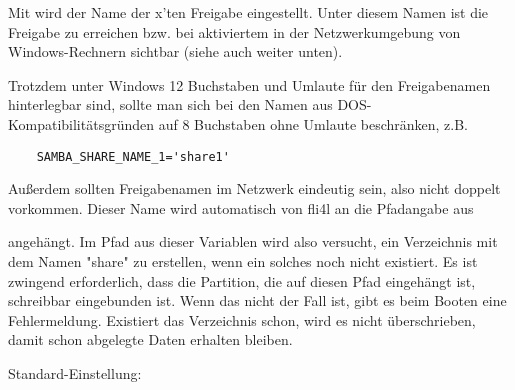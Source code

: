 \begin{description}

        Mit  wird der Name der x'ten Freigabe eingestellt.
        Unter diesem Namen ist die Freigabe zu erreichen bzw. bei aktiviertem
         in der Netzwerkumgebung von Windows-Rechnern sichtbar
        (siehe auch  weiter unten).

        Trotzdem unter Windows 12 Buchstaben und Umlaute für den Freigabenamen
        hinterlegbar sind, sollte man sich bei den Namen aus
        DOS-Kompatibilitätsgründen auf 8 Buchstaben ohne Umlaute beschränken,
        z.B.

\begin{example}
\begin{verbatim}
    SAMBA_SHARE_NAME_1='share1'
\end{verbatim}
\end{example}


        Außerdem sollten Freigabenamen im Netzwerk eindeutig sein, also nicht
        doppelt vorkommen.
        Dieser Name wird automatisch von fli4l an die Pfadangabe aus


        angehängt. Im Pfad aus dieser Variablen wird also versucht, ein
        Verzeichnis mit dem Namen "share" zu erstellen, wenn ein solches noch
        nicht existiert.
        Es ist zwingend erforderlich, dass die Partition, die auf diesen Pfad
        eingehängt ist, schreibbar eingebunden ist. Wenn das nicht der Fall ist,
        gibt es beim Booten eine Fehlermeldung.
        Existiert das Verzeichnis schon, wird es nicht überschrieben, damit
        schon abgelegte Daten erhalten bleiben.

        Standard-Einstellung: 

\end{description}

